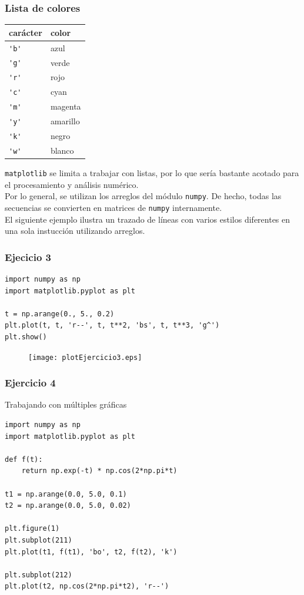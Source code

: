 \begin{frame}[fragile]
\frametitle{Lista de colores}
\begin{tabular}{l | l}
carácter & color \\ \hline
\verb|'b'| & azul \\ \hline
\verb|'g'| & verde \\ \hline
\verb|'r'| & rojo \\ \hline
\verb|'c'| & cyan \\ \hline
\verb|'m'| & magenta \\ \hline
\verb|'y'| & amarillo \\ \hline
\verb|'k'| & negro \\ \hline
\verb|'w'| & blanco
\end{tabular}
\end{frame}
\begin{frame}
\texttt{matplotlib} se limita a trabajar con listas, por lo que sería bastante acotado para el procesamiento y análisis numérico.
\\
\medskip
Por lo general, se utilizan los arreglos del módulo \texttt{numpy}. De hecho, todas las secuencias se convierten en matrices de \texttt{numpy} internamente.
\\
\medskip
El siguiente ejemplo ilustra un trazado de líneas con varios estilos diferentes en una sola instucción utilizando arreglos.
\end{frame}
\begin{frame}[fragile]
\frametitle{Ejecicio 3}
\begin{lstlisting}
import numpy as np
import matplotlib.pyplot as plt

t = np.arange(0., 5., 0.2)
plt.plot(t, t, 'r--', t, t**2, 'bs', t, t**3, 'g^')
plt.show()
\end{lstlisting}
\end{frame}
\begin{frame}[fragile]
\begin{figure}
	\centering
	\texttt{[image: plotEjercicio3.eps]}
\end{figure}
\end{frame}
\begin{frame}[fragile]
\frametitle{Ejercicio 4}
Trabajando con múltiples gráficas
\begin{lstlisting}
import numpy as np
import matplotlib.pyplot as plt

def f(t):
    return np.exp(-t) * np.cos(2*np.pi*t)

t1 = np.arange(0.0, 5.0, 0.1)
t2 = np.arange(0.0, 5.0, 0.02)

plt.figure(1)
plt.subplot(211)
plt.plot(t1, f(t1), 'bo', t2, f(t2), 'k')

plt.subplot(212)
plt.plot(t2, np.cos(2*np.pi*t2), 'r--')
\end{lstlisting}
\end{frame}

